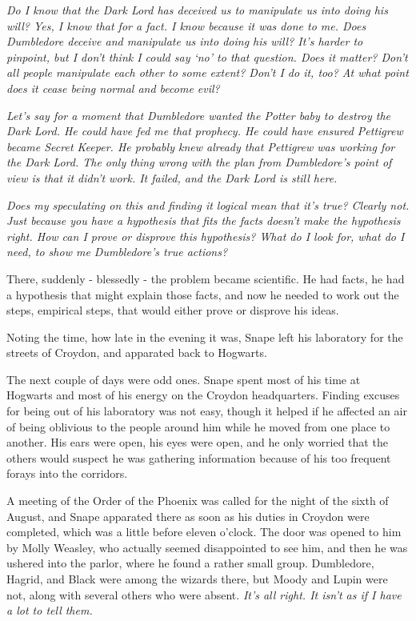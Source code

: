 \documentclass[a4paper,11pt]{article}
\begin{document}
\emph{Do I know that the Dark Lord has deceived us to manipulate us into doing his will? Yes, I know that for a fact. I know because it was done to me. Does Dumbledore deceive and manipulate us into doing his will? It's harder to pinpoint, but I don't think I could say `no' to that question. Does it matter? Don't all people manipulate each other to some extent? Don't I do it, too? At what point does it cease being normal and become evil?}

\emph{Let's say for a moment that Dumbledore wanted the Potter baby to destroy the Dark Lord. He could have fed me that prophecy. He could have ensured Pettigrew became Secret Keeper. He probably knew already that Pettigrew was working for the Dark Lord. The only thing wrong with the plan from Dumbledore's point of view is that it didn't work. It failed, and the Dark Lord is still here.}

\emph{Does my speculating on this and finding it logical mean that it's true? Clearly not. Just because you have a hypothesis that fits the facts doesn't make the hypothesis right. How can I prove or disprove this hypothesis? What do I look for, what do I need, to show me Dumbledore's true actions?}

There, suddenly - blessedly - the problem became scientific. He had facts, he had a hypothesis that might explain those facts, and now he needed to work out the steps, empirical steps, that would either prove or disprove his ideas.

Noting the time, how late in the evening it was, Snape left his laboratory for the streets of Croydon, and apparated back to Hogwarts.

The next couple of days were odd ones. Snape spent most of his time at Hogwarts and most of his energy on the Croydon headquarters. Finding excuses for being out of his laboratory was not easy, though it helped if he affected an air of being oblivious to the people around him while he moved from one place to another. His ears were open, his eyes were open, and he only worried that the others would suspect he was gathering information because of his too frequent forays into the corridors.

A meeting of the Order of the Phoenix was called for the night of the sixth of August, and Snape apparated there as soon as his duties in Croydon were completed, which was a little before eleven o'clock. The door was opened to him by Molly Weasley, who actually seemed disappointed to see him, and then he was ushered into the parlor, where he found a rather small group. Dumbledore, Hagrid, and Black were among the wizards there, but Moody and Lupin were not, along with several others who were absent. \emph{It's all right. It isn't as if I have a lot to tell them.}
\end{document}
